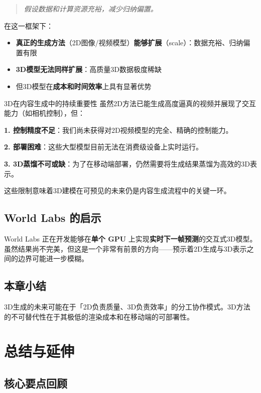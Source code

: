 \documentclass[a4paper]{article}
\begin{document}
\begin{quote}
\textit{假设数据和计算资源充裕，减少归纳偏置。}
\end{quote}

在这一框架下：
\begin{itemize}
    \item \textbf{真正的生成方法}（2D图像/视频模型）\textbf{能够扩展}（scale）：数据充裕、归纳偏置有限
    \item \textbf{3D模型无法同样扩展}：高质量3D数据极度稀缺
    \item 但3D模型在\textbf{成本和时间效率}上具有显著优势
\end{itemize}

\begin{importantbox}{3D在内容生成中的持续重要性}
虽然2D方法已能生成高度逼真的视频并展现了交互能力（如相机控制），但：

\textbf{1. 控制精度不足}：我们尚未获得对2D视频模型的完全、精确的控制能力。

\textbf{2. 部署困难}：这些大型模型目前无法在消费级设备上实时运行。

\textbf{3. 3D蒸馏不可或缺}：为了在移动端部署，仍然需要将生成结果蒸馏为高效的3D表示。

这些限制意味着3D建模在可预见的未来仍是内容生成流程中的关键一环。
\end{importantbox}

\subsection{World Labs 的启示}

World Labs 正在开发能够在\textbf{单个 GPU} 上实现\textbf{实时下一帧预测}的交互式3D模型。虽然结果尚不完美，但这是一个非常有前景的方向——预示着2D生成与3D表示之间的边界可能进一步模糊。

\subsection{本章小结}

3D生成的未来可能在于「2D负责质量、3D负责效率」的分工协作模式。3D方法的不可替代性在于其极低的渲染成本和在移动端的可部署性。

\section{总结与延伸}

\subsection{核心要点回顾}
\end{document}
